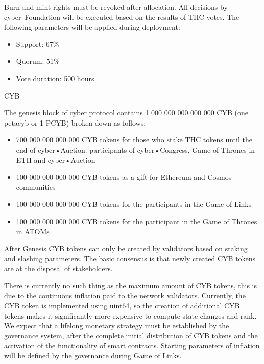 \documentclass[8pt,oneside]{amsart}
\makeatletter
\renewcommand\subsection{\@startsection{subsection}
                                    {2}{\z@}
                                    {-3.25ex\@plus -1ex \@minus -.2ex}
                                    {0ex \@plus .2ex}
                                    {\play\Large}
                        }
\newcommand{\titleSection}[1]{\subsection{#1}}
\newenvironment{Figure}
  {\par\medskip\noindent\minipage{\linewidth}}
  {\endminipage\par\medskip}
\makeatother
\begin{document}
Burn and mint rights must be revoked after allocation. All decisions by cyber~Foundation will be executed based on the results of THC votes. The following parameters will be applied during deployment:

\begin{itemize}
\item Support: 67\%
\item Quorum: 51\%
\item Vote duration: 500 hours
\end{itemize}

\titleSection{CYB}\label{cyb}

The genesis block of cyber protocol contains 1 000 000 000 000 000 CYB (one petacyb or 1 PCYB) broken down as follows:

\begin{itemize}
\item 700 000 000 000 000 CYB tokens for those who stake {\hyperref[thc]{THC}} tokens until the end of cyber•Auction: participants of cyber•Congress, Game of Thrones in ETH and cyber•Auction
\item 100 000 000 000 000 CYB tokens as a gift for Ethereum and Cosmos communities
\item 100 000 000 000 000 CYB tokens for the participants in the Game of Links
\item 100 000 000 000 000 CYB tokens for the participant in the Game of Thrones in ATOMs
\end{itemize}

\begin{Figure}
 \centering
 
\end{Figure}

After Genesis CYB tokens can only be created by validators based on staking and slashing parameters. The basic consensus is that newly created CYB tokens are at the disposal of stakeholders.

There is currently no such thing as the maximum amount of CYB tokens, this is due to the continuous inflation paid to the network validators. Currently, the CYB token is implemented using uint64, so the creation of additional CYB tokens makes it significantly more expensive to compute state changes and rank. We expect that a lifelong monetary strategy must be established by the governance system, after the complete initial distribution of CYB tokens and the activation of the functionality of smart contracts. Starting parameters of inflation will be defined by the governance during Game of Links.
\end{document}
